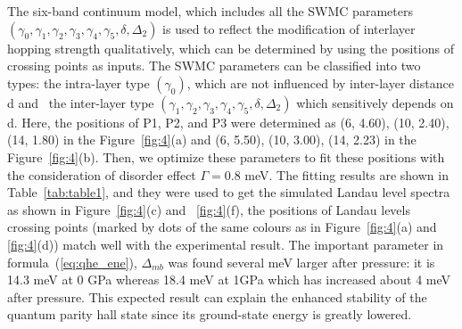 The six-band continuum model, which includes all the SWMC parameters $(\gamma_0, \gamma_1, \gamma_2, \gamma_3, \gamma_4, \gamma_5, \delta, \Delta_2)$ is used to reflect the modification of interlayer hopping strength qualitatively,
which can be determined by using the positions of crossing points as inputs. 
The SWMC parameters can be classified into two types: the intra-layer type $(\gamma_0)$, which are not influenced by inter-layer distance d and \
the inter-layer type $(\gamma_1, \gamma_2, \gamma_3, \gamma_4, \gamma_5, \delta, \Delta_2)$ which sensitively depends on d.
Here, the positions of P1, P2, and P3 were determined as (6, 4.60), (10, 2.40), (14, 1.80) in the Figure~\ref{fig:4}(a) and (6, 5.50), (10, 3.00), (14, 2.23) in the Figure~\ref{fig:4}(b). 
Then, we optimize these parameters to fit these positions with the consideration of disorder effect $\Gamma = 0.8$ meV. 
The fitting results are shown in Table~\ref{tab:table1}, and they were used to get the simulated Landau level spectra as shown in Figure~\ref{fig:4}(c) and ~\ref{fig:4}(f), 
the positions of Landau levels crossing points (marked by dots of the same colours as in Figure~\ref{fig:4}(a) and \ref{fig:4}(d)) match well with the experimental result.
The important parameter in formula~(\ref{eq:qhe_ene}), $\Delta_{mb}$ was found several meV larger after pressure: it is 14.3 meV at 0 GPa whereas 18.4 meV at 1GPa which has increased about 4 meV after pressure.
This expected result can explain the enhanced stability of the quantum parity hall state since its ground-state energy is greatly lowered.